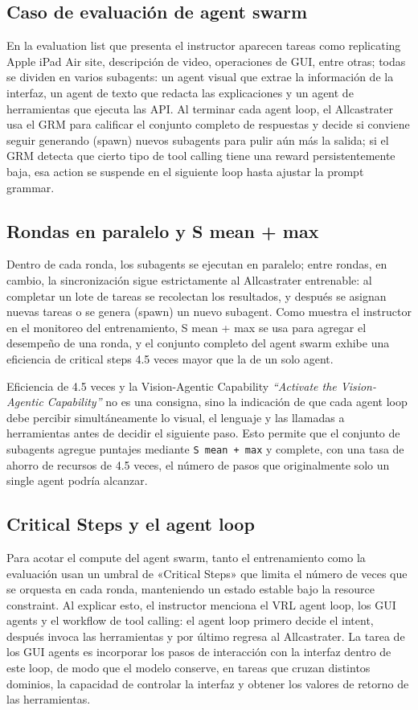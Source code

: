 \documentclass[a4paper]{article}
\begin{document}
\subsection{Caso de evaluación de agent swarm}
En la evaluation list que presenta el instructor aparecen tareas como replicating Apple iPad Air site, descripción de video, operaciones de GUI, entre otras; todas se dividen en varios subagents: un agent visual que extrae la información de la interfaz, un agent de texto que redacta las explicaciones y un agent de herramientas que ejecuta las API. Al terminar cada agent loop, el Allcastrater usa el GRM para calificar el conjunto completo de respuestas y decide si conviene seguir generando (spawn) nuevos subagents para pulir aún más la salida; si el GRM detecta que cierto tipo de tool calling tiene una reward persistentemente baja, esa action se suspende en el siguiente loop hasta ajustar la prompt grammar.

\subsection{Rondas en paralelo y S mean + max}
Dentro de cada ronda, los subagents se ejecutan en paralelo; entre rondas, en cambio, la sincronización sigue estrictamente al Allcastrater entrenable: al completar un lote de tareas se recolectan los resultados, y después se asignan nuevas tareas o se genera (spawn) un nuevo subagent. Como muestra el instructor en el monitoreo del entrenamiento, S mean + max se usa para agregar el desempeño de una ronda, y el conjunto completo del agent swarm exhibe una eficiencia de critical steps 4.5 veces mayor que la de un solo agent.

\begin{importantbox}{Eficiencia de 4.5 veces y la Vision-Agentic Capability}
\textit{``Activate the Vision-Agentic Capability''} no es una consigna, sino la indicación de que cada agent loop debe percibir simultáneamente lo visual, el lenguaje y las llamadas a herramientas antes de decidir el siguiente paso. Esto permite que el conjunto de subagents agregue puntajes mediante \texttt{S mean + max} y complete, con una tasa de ahorro de recursos de 4.5 veces, el número de pasos que originalmente solo un single agent podría alcanzar.
\end{importantbox}

\subsection{Critical Steps y el agent loop}
Para acotar el compute del agent swarm, tanto el entrenamiento como la evaluación usan un umbral de «Critical Steps» que limita el número de veces que se orquesta en cada ronda, manteniendo un estado estable bajo la resource constraint. Al explicar esto, el instructor menciona el VRL agent loop, los GUI agents y el workflow de tool calling: el agent loop primero decide el intent, después invoca las herramientas y por último regresa al Allcastrater. La tarea de los GUI agents es incorporar los pasos de interacción con la interfaz dentro de este loop, de modo que el modelo conserve, en tareas que cruzan distintos dominios, la capacidad de controlar la interfaz y obtener los valores de retorno de las herramientas.
\end{document}
